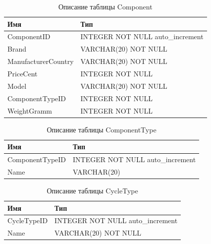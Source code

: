 \documentclass[a4paper,14pt]{extarticle}
\begin{document}

\begin{table}[h!] 
 \centering
	\caption{Описание таблицы Component}
	\begin{tabular}{|l|l|}
  \hline \textbf{Имя} & \textbf{Тип} \\
		\hline
		ComponentID &   INTEGER NOT NULL auto\_increment \\ \hline
		Brand & VARCHAR(20) NOT NULL \\ \hline
		ManufacturerCountry &  VARCHAR(20) NOT NULL \\ \hline
		PriceCent & INTEGER NOT NULL \\ \hline
		Model & VARCHAR(20) NOT NULL \\ \hline
		ComponentTypeID &  INTEGER NOT NULL \\ \hline
		WeightGramm &   INTEGER NOT NULL \\ \hline
	\end{tabular}
	\label{tab:component}
\end{table}

\begin{table}[h!] 
 \centering
	\caption{Описание таблицы ComponentType}
	\begin{tabular}{|l|l|}
  \hline \textbf{Имя} & \textbf{Тип} \\
		\hline
		ComponentTypeID &  INTEGER NOT NULL auto\_increment \\ \hline
		Name & VARCHAR(20) \\ \hline
	\end{tabular}
	\label{tab:componenttype}
\end{table}



\begin{table}[h!] 
 \centering
	\caption{Описание таблицы CycleType}
	\begin{tabular}{|l|l|}
  \hline \textbf{Имя} & \textbf{Тип} \\
		\hline
		CycleTypeID &   INTEGER NOT NULL auto\_increment \\ \hline
		Name &  VARCHAR(20) NOT NULL \\ \hline
	\end{tabular}
	\label{tab:cycletype}
\end{table}
\end{document}
